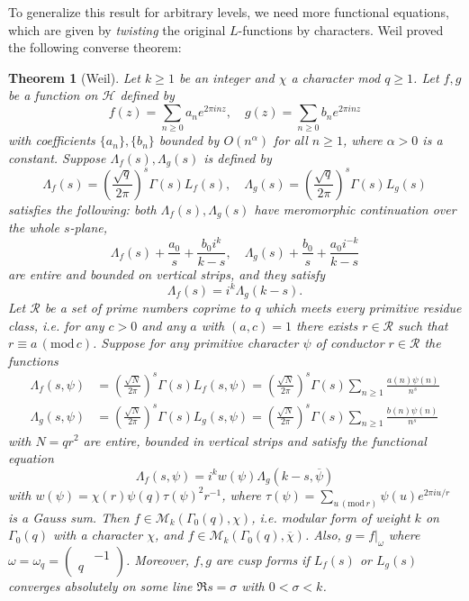 \documentclass{article}
\newtheorem{theorem}{Theorem}
\newcommand{\Mod}[1]{\,(\mathrm{mod}\,#1)}
\newcommand{\smat}[4]{\left(\begin{smallmatrix} #1 & #2 \\ #3 & #4 \end{smallmatrix}\right)}
\begin{document}
To generalize this result for arbitrary levels, we need more functional equations, which are given by \emph{twisting} the original $L$-functions by characters. Weil proved the following converse theorem:
\begin{theorem}[Weil]
Let $k\geq 1$ be an integer and $\chi$ a character mod $q\geq1$. 
Let $f, g$ be a function on $\mathcal{H}$ defined by 
$$
f(z) = \sum_{n\geq 0} a_{n}e^{2\pi i n z}, \quad g(z) = \sum_{n\geq 0} b_{n}e^{2\pi i n z}
$$
with coefficients $\{a_{n}\}, \{b_{n}\}$ bounded by $O(n^{\alpha})$ for all $n\geq 1$, where $\alpha>0$ is a constant. 
Suppose $\Lambda_{f}(s), \Lambda_{g}(s)$ is defined by 
$$
\Lambda_{f}(s) = \left(\frac{\sqrt{q}}{2\pi}\right)^{s}\Gamma(s) L_{f}(s), \quad \Lambda_{g}(s) = \left(\frac{\sqrt{q}}{2\pi}\right)^{s}\Gamma(s) L_{g}(s)
$$
satisfies the following: both $\Lambda_{f}(s), \Lambda_{g}(s)$  have meromorphic continuation over the whole $s$-plane, 
$$\Lambda_{f}(s) + \frac{a_{0}}{s} + \frac{b_{0}i^{k}}{k-s}, \quad \Lambda_{g}(s) + \frac{b_{0}}{s} + \frac{a_{0}i^{-k}}{k-s} $$
are entire and bounded on vertical strips, and they satisfy 
$$
\Lambda_{f}(s) = i^{k}\Lambda_{g}(k-s). 
$$
Let $\mathcal{R}$ be a set of prime numbers coprime to $q$ which meets every primitive residue class, i.e. for any $c>0$ and any $a$ with $(a, c) = 1$ there exists $r\in \mathcal{R}$ such that $r\equiv a\Mod{c}$. 
Suppose for any primitive character $\psi$ of conductor $r\in \mathcal{R}$ the functions
\begin{align*}
\Lambda_{f}(s,\psi) &= \left(\frac{\sqrt{N}}{2\pi}\right)^{s}\Gamma(s) L_{f}(s, \psi) = \left(\frac{\sqrt{N}}{2\pi}\right)^{s}\Gamma(s) \sum_{n\geq 1} \frac{a(n)\psi(n)}{n^{s}}
\\ \Lambda_{g}(s, \psi) &= \left(\frac{\sqrt{N}}{2\pi}\right)^{s} \Gamma(s) L_{g}(s, \psi)= \left(\frac{\sqrt{N}}{2\pi}\right)^{s}\Gamma(s) \sum_{n\geq 1} \frac{b(n)\psi(n)}{n^{s}}
\end{align*}
with $N = qr^{2}$ are entire, bounded in vertical strips and satisfy the functional equation 
$$
\Lambda_{f}(s, \psi) = i^{k} w(\psi)\Lambda_{g}(k-s, \overline{\psi})
$$
with $w(\psi) = \chi(r)\psi(q)\tau(\psi)^{2}r^{-1}$, where $\tau(\psi)=\sum_{u\Mod{r}}\psi(u)e^{2\pi i u/r}$ is a Gauss sum. 
Then $f\in \mathcal{M}_{k}(\Gamma_{0}(q), \chi)$, i.e. modular form of weight $k$ on $\Gamma_{0}(q)$ with a character $\chi$, and $f\in \mathcal{M}_{k}(\Gamma_{0}(q), \overline{\chi})$. 
Also, $g = f|_{\omega}$ where $\omega = \omega_{q} = \smat{}{-1}{q}{}$. 
Moreover, $f, g$ are cusp forms if $L_{f}(s)$ or $L_{g}(s)$ converges absolutely on some line $\Re s = \sigma$ with $0<\sigma < k$. 
\end{theorem}
 
\end{document}
